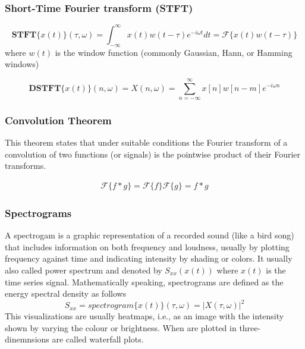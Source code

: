 \subsubsection{Short-Time Fourier transform (STFT)}

\begin{equation}\label{STFT}
    \textbf{STFT}\{x(t)\}(\tau, \omega) = \int_{-\infty}^\infty x(t) w(t-\tau )e^{-i\omega t} dt = \mathcal{F} \{ x(t)w(t-\tau)\}
\end{equation}
where $w(t)$ is the window function (commonly Gaussian, Hann, or Hamming windows)


\begin{equation}\label{STFT}
    \textbf{DSTFT}\{x(t)\}(n, \omega) = X(n,\omega)= \sum_{n=-\infty}^\infty x[n] w [n-m]e^{-i\omega n} 
\end{equation}

\subsubsection{Convolution Theorem}

This theorem states that under suitable conditions the Fourier transform of a convolution of two functions (or signals) is the pointwise product of their Fourier transforms.

\begin{gather}\label{convolution_theorem}
    \mathcal{F} \{ f * g\} = \mathcal{F} \{ f \} \mathcal{F} \{  g\} = f*g
\end{gather}


\subsubsection{Spectrograms}

A spectrogam is a graphic representation of a recorded
sound (like a bird song) that includes information on
both frequency and loudness, usually by plotting frequency against time and indicating intensity by shading or colors. It usually also called power spectrum and denoted by $S_{xx}(x(t))$ where $x(t)$ is the time series signal. Mathematically speaking, spectrograms are defined as the energy spectral density as follows
\begin{equation}\label{spectro_STFT}
    S_{xx} = spectrogram\{x(t)\} (\tau,\omega) = |X(\tau, \omega)|^2
\end{equation}
This visualizations are usually heatmaps, i.e., as an image with the intensity shown by varying the colour or brightness. When are plotted in three-dinemnsions are called waterfall plots.

